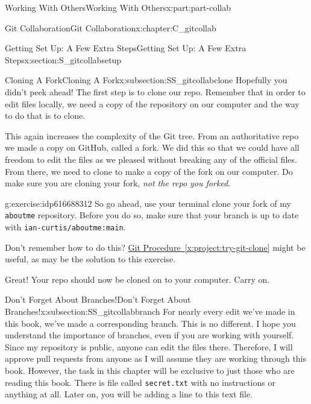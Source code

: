 \documentclass[oneside,10pt,]{book}
\newcommand{\xreffont}{\relax}
\newcommand{\mono}[1]{\texttt{#1}}
\begin{document}
\begin{partptx}{Working With Others}{}{Working With Others}{}{}{x:part:part-collab}
\begin{chapterptx}{Git Collaboration}{}{Git Collaboration}{}{}{x:chapter:C_gitcollab}
\begin{sectionptx}{Getting Set Up: A Few Extra Steps}{}{Getting Set Up: A Few Extra Steps}{}{}{x:section:S_gitcollabsetup}
\begin{introduction}{}
\end{introduction}%
%
%
\typeout{************************************************}
\typeout{************************************************}
%
\begin{subsectionptx}{Cloning A Fork}{}{Cloning A Fork}{}{}{x:subsection:SS_gitcollabclone}
%
%
Hopefully you didn't peek ahead! The first step is to clone our repo. Remember that in order to edit files locally, we need a copy of the repository on our computer and the way to do that is to clone.%
\par
This again increases the complexity of the Git tree. From an authoritative repo we made a copy on GitHub, called a fork. We did this so that we could have all freedom to edit the files as we pleased without breaking any of the official files. From there, we need to clone to make a copy of the fork on our computer. Do make sure you are cloning your fork, \emph{not the repo you forked}.%
\begin{inlineexercise}{}{g:exercise:idp616688312}%
So go ahead, use your terminal clone your fork of my \mono{aboutme} repository. Before you do so, make sure that your branch is up to date with \mono{ian-curtis/aboutme:main}.%
\par
Don't remember how to do this? \hyperref[x:project:try-git-clone]{Git Procedure~{\xreffont\ref{x:project:try-git-clone}}} might be useful, as may be the solution to this exercise.%
\end{inlineexercise}%
Great! Your repo should now be cloned on to your computer. Carry on.%
\end{subsectionptx}
%
%
\typeout{************************************************}
\typeout{************************************************}
%
\begin{subsectionptx}{Don't Forget About Branches!}{}{Don't Forget About Branches!}{}{}{x:subsection:SS_gitcollabbranch}
%
%
For nearly every edit we've made in this book, we've made a corresponding branch. This is no different. I hope you understand the importance of branches, even if you are working with yourself. Since my repository is public, anyone can edit the files there. Therefore, I will approve pull requests from anyone as I will assume they are working through this book. However, the task in this chapter will be exclusive to just those who are reading this book. There is file called \mono{secret.txt} with no instructions or anything at all. Later on, you will be adding a line to this text file.%

\end{subsectionptx}
\end{sectionptx}
\end{chapterptx}
\end{partptx}
\end{document}
